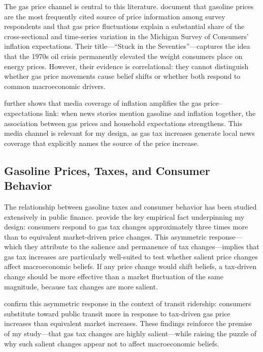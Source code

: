 \documentclass[12pt]{article}
\begin{document}
The gas price channel is central to this literature. \citet{binder2022stuck} document that gasoline prices are the most frequently cited source of price information among survey respondents and that gas price fluctuations explain a substantial share of the cross-sectional and time-series variation in the Michigan Survey of Consumers' inflation expectations. Their title---``Stuck in the Seventies''---captures the idea that the 1970s oil crisis permanently elevated the weight consumers place on energy prices. However, their evidence is correlational: they cannot distinguish whether gas price movements cause belief shifts or whether both respond to common macroeconomic drivers.

\citet{binder2018inflation} further shows that media coverage of inflation amplifies the gas price--expectations link: when news stories mention gasoline and inflation together, the association between gas prices and household expectations strengthens. This media channel is relevant for my design, as gas tax increases generate local news coverage that explicitly names the source of the price increase.

\subsection{Gasoline Prices, Taxes, and Consumer Behavior}

The relationship between gasoline taxes and consumer behavior has been studied extensively in public finance. \citet{li2014gasoline} provide the key empirical fact underpinning my design: consumers respond to gas tax changes approximately three times more than to equivalent market-driven price changes. This asymmetric response---which they attribute to the salience and permanence of tax changes---implies that gas tax increases are particularly well-suited to test whether salient price changes affect macroeconomic beliefs. If any price change would shift beliefs, a tax-driven change should be more effective than a market fluctuation of the same magnitude, because tax changes are more salient.

\citet{rivers2017salience} confirm this asymmetric response in the context of transit ridership: consumers substitute toward public transit more in response to tax-driven gas price increases than equivalent market increases. These findings reinforce the premise of my study---that gas tax changes are highly salient---while raising the puzzle of why such salient changes appear not to affect macroeconomic beliefs.
\end{document}
